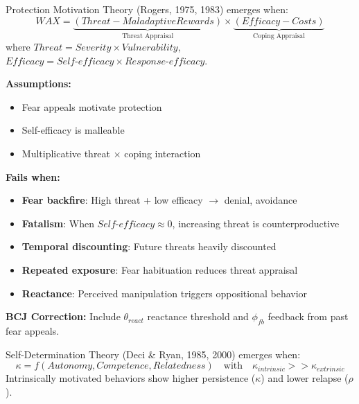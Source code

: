 \begin{theorem}
\label{thm:protection-motivation}
Protection Motivation Theory (Rogers, 1975, 1983) emerges when:
\begin{equation}
\boxed{WAX = \underbrace{(Threat - Maladaptive Rewards)}_{\text{Threat Appraisal}} \times \underbrace{(Efficacy - Costs)}_{\text{Coping Appraisal}}}
\end{equation}
where $Threat = Severity \times Vulnerability$, $Efficacy = Self\text{-}efficacy \times Response\text{-}efficacy$.
\end{theorem}

\begin{tcolorbox}[colback=red!5!white, colframe=red!75!black, title=Boundary Condition: Where PMT Fails]
\textbf{Assumptions:}
\begin{itemize}[nosep]
\item Fear appeals motivate protection
\item Self-efficacy is malleable
\item Multiplicative threat × coping interaction
\end{itemize}

\textbf{Fails when:}
\begin{itemize}[nosep]
\item \textbf{Fear backfire}: High threat + low efficacy $\to$ denial, avoidance
\item \textbf{Fatalism}: When $Self\text{-}efficacy \approx 0$, increasing threat is counterproductive
\item \textbf{Temporal discounting}: Future threats heavily discounted
\item \textbf{Repeated exposure}: Fear habituation reduces threat appraisal
\item \textbf{Reactance}: Perceived manipulation triggers oppositional behavior
\end{itemize}

\textbf{BCJ Correction:} Include $\theta_{react}$ reactance threshold and $\phi_{fb}$ feedback from past fear appeals.
\end{tcolorbox}


\begin{theorem}
\label{thm:self-determination}
Self-Determination Theory (Deci \& Ryan, 1985, 2000) emerges when:
\begin{equation}
\boxed{\kappa = f(Autonomy, Competence, Relatedness) \quad \text{with} \quad \kappa_{intrinsic} >> \kappa_{extrinsic}}
\end{equation}
Intrinsically motivated behaviors show higher persistence ($\kappa$) and lower relapse ($\rho$).
\end{theorem}

